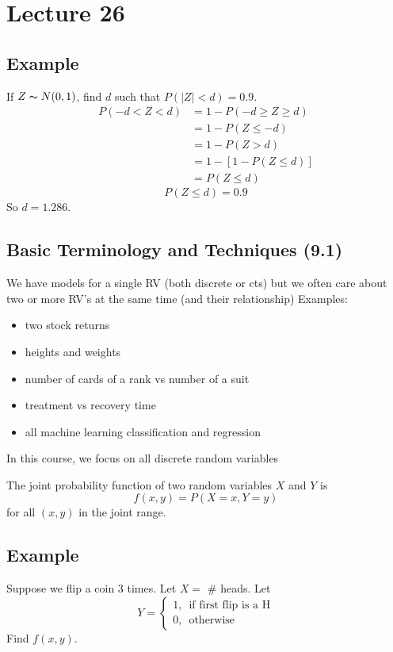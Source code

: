 \section{Lecture 26}
\subsection{Example}
If $ Z \thicksim N(0,1) $, find $ d $ such that $ P(|Z|<d)=0.9 $.
\begin{align*}
    P(-d<Z<d)&=1-P(-d\ge Z\ge d)\\
    &=1-P(Z\le -d)\\
    &=1-P(Z>d)\\
    &=1-[1-P(Z\le d)]\\
    &=P(Z\le d)
\end{align*}
\[ P(Z\le d)=0.9\]
So $ d=1.286 $.

\subsection{Basic Terminology and Techniques (9.1)}
We have models for a single RV (both discrete or cts) but we often
care about two or more RV's at the same time (and their relationship)
Examples:
\begin{itemize}
    \item two stock returns
    \item heights and weights
    \item number of cards of a rank vs number of a suit
    \item treatment vs recovery time
    \item all machine learning classification and regression
\end{itemize}
In this course, we focus on all discrete random variables

\begin{defbox}
    The joint probability function of two random variables $ X $ and $ Y $ is
    \[ f(x,y)=P(X=x,Y=y) \]
    for all $ (x,y) $ in the joint range.
\end{defbox}

\subsection{Example}
Suppose we flip a coin 3 times. Let $ X= $ \# heads.
Let
\[ Y=\begin{cases}
    1,\,\text{ if first flip is a H}\\
    0,\, \text{ otherwise}
\end{cases} \]
Find $ f(x,y) $.

